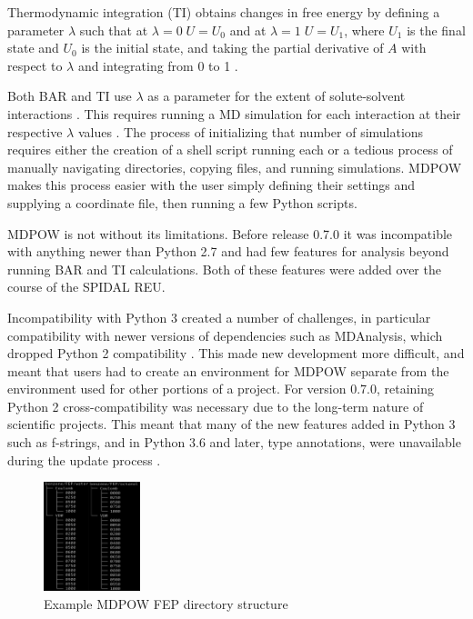 \documentclass{article}[letterpaper, margins=1in, 12pt]
\begin{document}
Thermodynamic integration (TI) obtains changes in free energy by defining a parameter $\lambda$ such that at $\lambda = 0 \; U = U_0$ and at $\lambda = 1 \; U = U_1$, where $U_1$ is the final state and $U_0$ is the initial state, and taking the partial derivative of $A$ with respect to $\lambda$ and integrating from 0 to 1 \cite{chipot_free_2007}.

Both BAR and TI use $\lambda$ as a parameter for the extent of solute-solvent interactions \cite{chipot_free_2007}. This requires running a MD simulation for  each interaction at their respective $\lambda$ values \cite{lemkul_proteins_2019}. The process of initializing that number of simulations requires either the creation of a shell script running each or a tedious process of manually navigating directories, copying files, and running simulations. MDPOW makes this process easier with the user simply defining their settings and supplying a coordinate file, then running a few Python scripts.

MDPOW is not without its limitations. Before release 0.7.0 it was incompatible with anything newer than Python 2.7 and had few features for analysis beyond running BAR and TI calculations. Both of these features were added over the course of the SPIDAL REU.

Incompatibility with Python 3 created a number of challenges, in particular compatibility with newer versions of dependencies such as MDAnalysis, which dropped Python 2 compatibility \cite{michaud-agrawal_mdanalysis_2011, gowers_mdanalysis_2016}. This made new development more difficult, and meant that users had to create an environment for MDPOW separate from the environment used for other portions of a project. For version 0.7.0, retaining Python 2 cross-compatibility was  necessary due to the long-term nature of scientific projects. This meant that many of the new features added in Python 3 such as f-strings, and in Python 3.6 and later, type annotations, were unavailable during the update process \cite{fan_precise_2021, beckstein_prediction_2012}.

\begin{figure}
	\centering
	\includegraphics[width=0.25\textwidth]{directory}
	\caption{Example MDPOW FEP directory structure}
	\label{fig:directory}
\end{figure}
\end{document}
